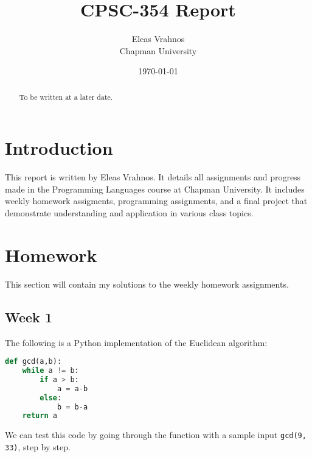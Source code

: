 \documentclass{article}
\title{CPSC-354 Report}
\author{Eleas Vrahnos  \\ Chapman University}
\date{\today}
\theoremstyle{theorem}
\theoremstyle{definition}
\theoremstyle{remark}
\begin{document}
\maketitle

\begin{abstract}
To be written at a later date. 
\end{abstract}

\tableofcontents

\section{Introduction}\label{intro}

This report is written by Eleas Vrahnos. It details all assignments and progress made in the Programming Languages course at Chapman University. It includes weekly homework assigments, programming assignments, and a final project that demonstrate understanding and application in various class topics.

\section{Homework}\label{homework}

This section will contain my solutions to the weekly homework assignments. 

\subsection{Week 1}

The following is a Python implementation of the Euclidean algorithm:

\begin{lstlisting}[language=Python]
def gcd(a,b):
    while a != b:
        if a > b:
            a = a-b
        else:
            b = b-a
    return a
\end{lstlisting}

\newpage %

\noindent We can test this code by going through the function with a sample input \texttt{gcd(9, 33)}, step by step.
\end{document}
